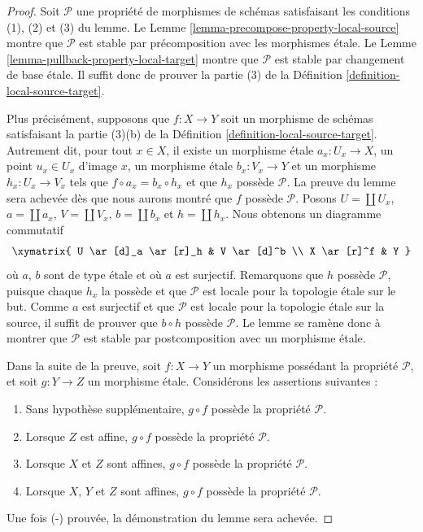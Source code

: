 \begin{proof}
Soit $\mathcal{P}$ une propriété de morphismes de schémas satisfaisant les
conditions (1), (2) et (3) du lemme. Le
Lemme \ref{lemma-precompose-property-local-source} montre que $\mathcal{P}$ est
stable par précomposition avec les morphismes \'etale. Le
Lemme \ref{lemma-pullback-property-local-target} montre que $\mathcal{P}$ est
stable par changement de base \'etale. Il suffit donc de prouver la partie (3)
de la Définition \ref{definition-local-source-target}.

\medskip\noindent
Plus précisément, supposons que $f : X \to Y$ soit un morphisme de schémas
satisfaisant la partie (3)(b) de la
Définition \ref{definition-local-source-target}. Autrement dit, pour tout
$x \in X$, il existe un morphisme \'etale $a_x : U_x \to X$, un point
$u_x \in U_x$ d'image $x$, un morphisme \'etale $b_x : V_x \to Y$ et un
morphisme $h_x : U_x \to V_x$ tels que $f \circ a_x = b_x \circ h_x$ et que
$h_x$ possède $\mathcal{P}$. La preuve du lemme sera achevée dès que nous
aurons montré que $f$ possède $\mathcal{P}$. Posons $U = \coprod U_x$,
$a = \coprod a_x$, $V = \coprod V_x$, $b = \coprod b_x$ et
$h = \coprod h_x$. Nous obtenons un diagramme commutatif
$$
\xymatrix{
U \ar[d]_a \ar[r]_h & V \ar[d]^b \\
X \ar[r]^f & Y
}
$$
où $a$, $b$ sont de type \'etale et où $a$ est surjectif. Remarquons que $h$
possède $\mathcal{P}$, puisque chaque $h_x$ la possède et que $\mathcal{P}$ est
locale pour la topologie \'etale sur le but. Comme $a$ est surjectif et que
$\mathcal{P}$ est locale pour la topologie \'etale sur la source, il suffit de
prouver que $b \circ h$ possède $\mathcal{P}$. Le lemme se ramène donc à
montrer que $\mathcal{P}$ est stable par postcomposition avec un morphisme
\'etale.

\medskip\noindent
Dans la suite de la preuve, soit $f : X \to Y$ un morphisme possédant la
propriété $\mathcal{P}$, et soit $g : Y \to Z$ un morphisme \'etale.
Considérons les assertions suivantes :
\begin{enumerate}
\item[(-)] Sans hypothèse supplémentaire, $g \circ f$ possède la propriété
$\mathcal{P}$.
\item[(A)] Lorsque $Z$ est affine, $g \circ f$ possède la propriété
$\mathcal{P}$.
\item[(AA)] Lorsque $X$ et $Z$ sont affines, $g \circ f$ possède la propriété
$\mathcal{P}$.
\item[(AAA)] Lorsque $X$, $Y$ et $Z$ sont affines, $g \circ f$ possède la
propriété $\mathcal{P}$.
\end{enumerate}
Une fois (-) prouvée, la démonstration du lemme sera achevée.


\end{proof}
